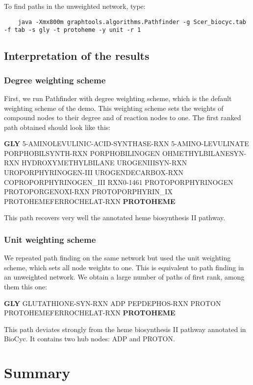 To find paths in the unweighted network, type:
	{\color{Blue} \begin{footnotesize}
		\begin{verbatim}
	java -Xmx800m graphtools.algorithms.Pathfinder -g Scer_biocyc.tab -f tab -s gly -t protoheme -y unit -r 1
	\end{verbatim} \end{footnotesize}
	}

\subsection{Interpretation of the results}

\subsubsection{Degree weighting scheme}

First, we run Pathfinder with degree weighting scheme, which is the default weighting scheme of the demo. This weighting scheme sets the weights of compound nodes to their degree and of reaction nodes to one. The first ranked path obtained should look like this:

\textbf{GLY} 5-AMINOLEVULINIC-ACID-SYNTHASE-RXN  5-AMINO-LEVULINATE  PORPHOBILSYNTH-RXN PORPHOBILINOGEN OHMETHYLBILANESYN-RXN HYDROXYMETHYLBILANE UROGENIIISYN-RXN UROPORPHYRINOGEN-III UROGENDECARBOX-RXN COPROPORPHYRINOGEN\_III RXN0-1461 PROTOPORPHYRINOGEN PROTOPORGENOXI-RXN PROTOPORPHYRIN\_IX PROTOHEMEFERROCHELAT-RXN \textbf{PROTOHEME}

This path recovers very well the annotated heme biosynthesis II pathway.

\subsubsection{Unit weighting scheme}
We repeated path finding on the same network but used the unit weighting scheme, which sets all node weights to one. This is equivalent to path finding in an unweighted network. We obtain a large number of paths of first rank, among them this one:

\textbf{GLY} GLUTATHIONE-SYN-RXN ADP PEPDEPHOS-RXN PROTON PROTOHEMEFERROCHELAT-RXN \textbf{PROTOHEME}

This path deviates strongly from the heme biosynthesis II pathway annotated in BioCyc. It contains two hub nodes: ADP and PROTON.

\section{Summary}

